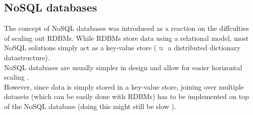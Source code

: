 \documentclass[12pt]{report}
\begin{document}
\subsection{NoSQL databases}
The concept of NoSQL databases was introduced as a reaction on the
diffculties of scaling out RDBMs. While RDBMs store data using a relational
model, most NoSQL solutions simply act as a key-value store ($\approx$
a distributed dictionary datastructure).\\
NoSQL databases are usually simpler in design and allow for easier horizontal
scaling \cite{wikipedia_nosql}.\\
However, since data is simply stored in a key-value store, joining
over multiple datasets (which can be easily done with RDBMs) has to be
implemented on top of the NoSQL database (doing this might still
be slow \cite{nosql_problems}). \\
\end{document}
